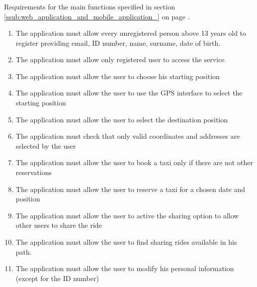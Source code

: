 \subsubsection{}
Requirements for the main functions specified in section \ref{ssub:web_application_and_mobile_application_} on page \pageref{ssub:web_application_and_mobile_application_}.
\begin{enumerate}[resume*]
	\item The application must allow every unregistered person above 13 years old to register providing email, ID number, name, surname, date of birth.
	\item The application must allow only registered user to access the service
	\item The application must allow the user to choose his starting position
	\item The application must allow the user to use the GPS interface to select the starting position
	\item The application must allow the user to select the destination position
	\item The application must check that only valid coordinates and addresses  are selected by the user
	\item The application must allow the user to book a taxi only if there are not other reservations
	\item The application must allow the user to reserve a taxi for a chosen  date and position
	\item The application must allow the user to active the sharing option to allow other users to share the ride
	\item The application must allow the user to find sharing rides available in his path. 
	\item The application must allow the user to modify his personal information (except for the ID number)
\end{enumerate}

